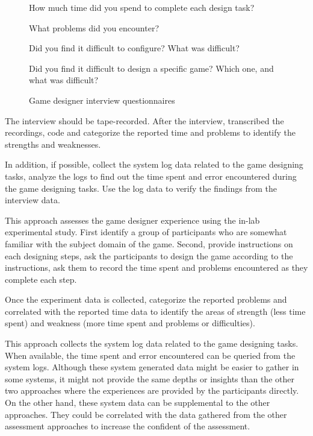 \begin{figure}[ht!]
\begin{mybox}
\begin{compactenum}
\item How much time did you spend to complete each design task?
\item What problems did you encounter?
\item Did you find it difficult to configure? What was difficult?
\item Did you find it difficult to design a specific game? Which one, and what was difficult?
\end{compactenum}
\end{mybox}
\caption{Game designer interview questionnaires}
\label{fig:game-designer-interview}  
\end{figure}

The interview should be tape-recorded. After the interview, transcribed the recordings, code and categorize the reported 
time and problems to identify the strengths and weaknesses.

In addition, if possible, collect the system log data related to the game designing tasks, analyze the logs to find out the time 
spent and error encountered during the game designing tasks. Use the log data to verify the findings from the interview data.

\label{In-lab game design study}

This approach assesses the game designer experience using the in-lab experimental study.  First identify a group 
of participants who are somewhat familiar with the subject domain of the game. Second, provide instructions on 
each designing steps, ask the participants to design the game according to the instructions, ask them to record 
the time spent and problems encountered as they complete each step.

Once the experiment data is collected, categorize the reported problems and correlated with the reported time data 
to identify the areas of strength (less time spent) and weakness (more time spent and problems or difficulties). 

\label{Game design log data analysis}

This approach collects the system log data related to the game designing tasks. When
available, the time spent and error encountered can be queried from the system logs. Although these
system generated data might be easier to gather in some systems, it might not provide the same
depths or insights than the other two approaches where the experiences are provided by the
participants directly. On the other hand, these system data can be supplemental to the other
approaches. They could be correlated with the data gathered from the other assessment approaches
 to increase the confident of the assessment.

